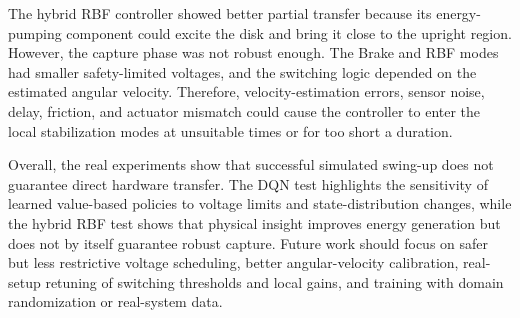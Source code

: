 The hybrid RBF controller showed better partial transfer because its
energy-pumping component could excite the disk and bring it close to the
upright region. However, the capture phase was not robust enough. The Brake and
RBF modes had smaller safety-limited voltages, and the switching logic depended
on the estimated angular velocity. Therefore, velocity-estimation errors,
sensor noise, delay, friction, and actuator mismatch could cause the controller
to enter the local stabilization modes at unsuitable times or for too short a
duration.

Overall, the real experiments show that successful simulated swing-up does not
guarantee direct hardware transfer. The DQN test highlights the sensitivity of
learned value-based policies to voltage limits and state-distribution changes,
while the hybrid RBF test shows that physical insight improves energy
generation but does not by itself guarantee robust capture. Future work should
focus on safer but less restrictive voltage scheduling, better angular-velocity
calibration, real-setup retuning of switching thresholds and local gains, and
training with domain randomization or real-system data.
